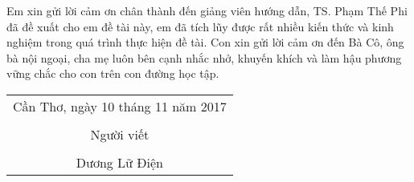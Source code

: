 \documentclass[./thesis.tex]{subfiles}
\begin{document}
Em xin gửi lời cảm ơn chân thành đến giảng viên hướng dẫn, TS. Phạm Thế Phi đã đề xuất cho em đề tài này, em đã tích lũy được rất nhiều kiến thức và kinh nghiệm trong quá trình thực hiện đề tài. Con xin gửi lời cảm ơn đến Bà Cô, ông bà nội ngoại, cha mẹ luôn bên cạnh nhắc nhở, khuyến khích và làm hậu phương vững chắc cho con trên con đường học tập.

\hspace*{\fill}
\begin{tabular}{@{}c@{}} 
Cần Thơ, ngày 10 tháng 11 năm 2017\\ \\
Người viết\\ \\
Dương Lữ Điện
\end{tabular}
\end{document}
